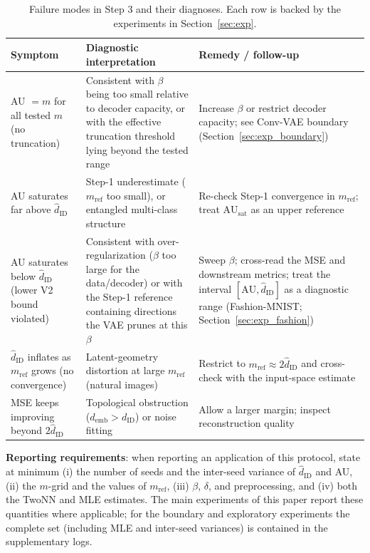\documentclass[make,article,submit,pdftex,moreauthors]{Definitions/mdpi}
\newcommand{\dID}{d_{\mathrm{ID}}}
\newcommand{\hatdID}{\hat{d}_{\mathrm{ID}}}
\newcommand{\AUsat}{\mathrm{AU}_{\mathrm{sat}}}
\newcommand{\demb}{d_{\mathrm{emb}}}
\begin{document}
\begin{table}[H]
\caption{Failure modes in Step 3 and their diagnoses. Each row is backed by
the experiments in Section~\ref{sec:exp}.}
\label{tab:failure}
\small
\begin{tabular}{p{3.9cm}p{4.3cm}p{4.3cm}}
\toprule
\textbf{Symptom} & \textbf{Diagnostic interpretation} & \textbf{Remedy / follow-up} \\
\midrule
AU $= m$ for all tested $m$ (no truncation) & Consistent with $\beta$ being too small relative to decoder capacity, or with the effective truncation threshold lying beyond the tested range & Increase $\beta$ or restrict decoder capacity; see Conv-VAE boundary (Section~\ref{sec:exp_boundary}) \\
AU saturates far above $\hatdID$ & Step-1 underestimate ($m_{\mathrm{ref}}$ too small), or entangled multi-class structure & Re-check Step-1 convergence in $m_{\mathrm{ref}}$; treat $\AUsat$ as an upper reference \\
AU saturates below $\hatdID$ (lower V2 bound violated) & Consistent with over-regularization ($\beta$ too large for the data/decoder) or with the Step-1 reference containing directions the VAE prunes at this $\beta$ & Sweep $\beta$; cross-read the MSE and downstream metrics; treat the interval $[\mathrm{AU}, \hatdID]$ as a diagnostic range (Fashion-MNIST; Section~\ref{sec:exp_fashion}) \\
$\hatdID$ inflates as $m_{\mathrm{ref}}$ grows (no convergence) & Latent-geometry distortion at large $m_{\mathrm{ref}}$ (natural images) & Restrict to $m_{\mathrm{ref}} \approx 2\hatdID$ and cross-check with the input-space estimate \\
MSE keeps improving beyond $2\hatdID$ & Topological obstruction ($\demb > \dID$) or noise fitting & Allow a larger margin; inspect reconstruction quality \\
\bottomrule
\end{tabular}
\end{table}

\textbf{Reporting requirements}:
when reporting an application of this protocol, state at minimum
(i) the number of seeds and the inter-seed variance of $\hatdID$ and AU,
(ii) the $m$-grid and the values of $m_{\mathrm{ref}}$,
(iii) $\beta$, $\delta$, and preprocessing, and
(iv) both the TwoNN and MLE estimates.
The main experiments of this paper report these quantities where
applicable; for the boundary and exploratory experiments the complete set
(including MLE and inter-seed variances) is contained in the supplementary
logs.
\end{document}
